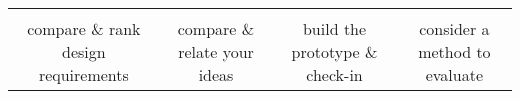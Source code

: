 {\begin{spacing}{1.0}
\begin{longtable}[]{cccc}
\begin{minipage}[t]{0.21\columnwidth}
\strut
\end{minipage} & \begin{minipage}[t]{0.21\columnwidth}\raggedright\strut
\strut
\end{minipage}\tabularnewline
\begin{minipage}[t]{0.21\columnwidth}\raggedright\strut
compare \& rank design requirements\strut
\end{minipage} & \begin{minipage}[t]{0.21\columnwidth}\raggedright\strut
compare \& relate your ideas\strut
\end{minipage} & \begin{minipage}[t]{0.21\columnwidth}\raggedright\strut
build the prototype \& check-in\strut
\end{minipage} & \begin{minipage}[t]{0.21\columnwidth}\raggedright\strut
consider a method to evaluate\strut
\end{minipage}\tabularnewline
\bottomrule
\end{longtable}
\end{spacing}
\newpage
}
